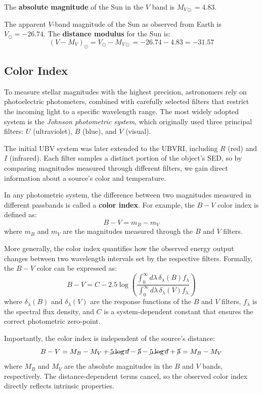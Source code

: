 \begin{observationblock}
    The \textbf{absolute magnitude} of the Sun in the $V$ band is $M_{V\odot} = 4.83$. 

    The apparent $V$-band magnitude of the Sun as observed from Earth is $V_\odot = -26.74$. 
    The \textbf{distance modulus} for the Sun is:
    $$
        (V - M_V)_\odot = V_\odot - M_{V\odot} = -26.74 - 4.83 = -31.57
    $$
\end{observationblock}

\subsection{Color Index}

To measure stellar magnitudes with the highest precision, astronomers rely on photoelectric photometers, combined with carefully selected filters that restrict the incoming light to a specific wavelength range. The most widely adopted system is the \textit{Johnson photometric system}, which originally used three principal filters: $U$ (ultraviolet), $B$ (blue), and $V$ (visual).

The initial UBV system was later extended to the UBVRI, including $R$ (red) and $I$ (infrared). Each filter samples a distinct portion of the object's SED, so by comparing magnitudes measured through different filters, we gain direct information about a source's color and temperature.

\medskip

In any photometric system, the difference between two magnitudes measured in different passbands is called a \textbf{color index}. For example, the $B - V$ color index is defined as:
$$
B - V = m_B - m_V
$$
where $m_B$ and $m_V$ are the magnitudes measured through the $B$ and $V$ filters. 

More generally, the color index quantifies how the observed energy output changes between two wavelength intervals set by the respective filters. Formally, the $B - V$ color can be expressed as:
$$
B - V = C - 2.5 \log \left( \dfrac{\int_0^\infty d\lambda\, \delta_\lambda(B) f_\lambda}{\int_0^\infty d\lambda\, \delta_\lambda(V) f_\lambda} \right)
$$
where $\delta_\lambda(B)$ and $\delta_\lambda(V)$ are the response functions of the $B$ and $V$ filters, $f_\lambda$ is the spectral flux density, and $C$ is a system-dependent constant that ensures the correct photometric zero-point.

Importantly, the color index is independent of the source's distance:
$$
B - V = M_B - M_V + \cancel{5 \log d} - \cancel{5} - \cancel{5 \log d} + \cancel{5} = M_B - M_V
$$
where $M_B$ and $M_V$ are the absolute magnitudes in the $B$ and $V$ bands, respectively. The distance-dependent terms cancel, so the observed color index directly reflects intrinsic properties.

